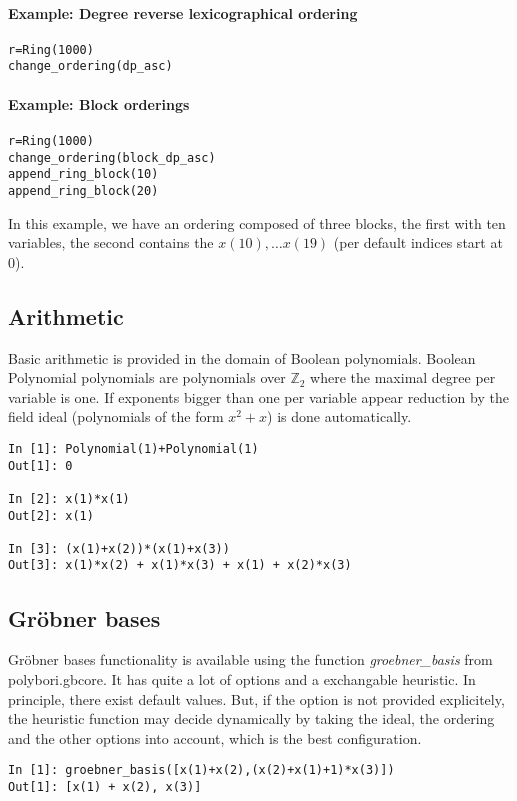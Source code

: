 \documentclass[]{article}
\newcommand{\Groebner}{Gröbner\xspace}
\newcommand{\functionname}[1]{\textit{#1}\xspace}
\newcommand{\Ztwo}{\mathbb{Z}_2}
\begin{document}
\paragraph{Example: Degree reverse lexicographical ordering}
\begin{verbatim}
r=Ring(1000)
change_ordering(dp_asc)
\end{verbatim}

\paragraph{Example: Block orderings}
\begin{verbatim}
r=Ring(1000)
change_ordering(block_dp_asc)
append_ring_block(10)
append_ring_block(20)
\end{verbatim}
In this example, we have an ordering composed of three blocks, the first with ten variables, the second contains the $x(10), \ldots x(19)$ (per default indices start at 0).
\subsection{Arithmetic}
Basic arithmetic is provided in the domain of Boolean polynomials. Boolean Polynomial polynomials are polynomials over $\Ztwo$ where the maximal degree per variable is one.
If exponents bigger than one per variable appear reduction by the field ideal (polynomials of the form $x^2+x$) is done automatically.
\begin{verbatim}
In [1]: Polynomial(1)+Polynomial(1)
Out[1]: 0

In [2]: x(1)*x(1)
Out[2]: x(1)

In [3]: (x(1)+x(2))*(x(1)+x(3))
Out[3]: x(1)*x(2) + x(1)*x(3) + x(1) + x(2)*x(3)
\end{verbatim}

\subsection{\Groebner bases}
\Groebner bases functionality is available using the function \functionname{groebner\_basis} from polybori.gbcore.
It has quite a lot of options and a exchangable heuristic.
In principle, there exist  default values. But, if the option is not provided explicitely, the heuristic function
may decide dynamically by taking the ideal, the ordering and the other options into account, which is the best configuration.
\begin{verbatim}
In [1]: groebner_basis([x(1)+x(2),(x(2)+x(1)+1)*x(3)])
Out[1]: [x(1) + x(2), x(3)]
\end{verbatim}
\end{document}
